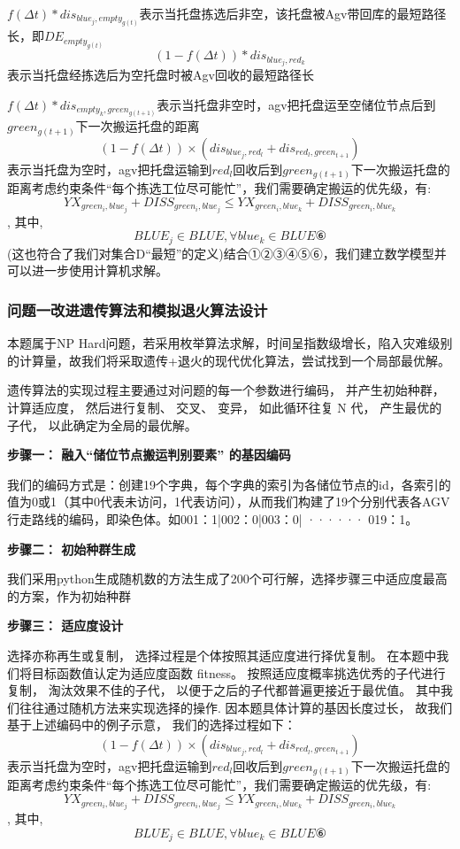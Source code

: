 \documentclass{article}
\begin{document}
$f(\Delta t)*dis_{blue_j,empty_{g(t)}}$表示当托盘拣选后非空，该托盘被Agv带回库的最短路径长，即$DE_{empty_{g(t)}}$
$$(1-f(\Delta t))*dis_{blue_j,red_k}$$表示当托盘经拣选后为空托盘时被Agv回收的最短路径长

$f(\Delta t)*dis_{empty_k,green_{g(t+1)}}$表示当托盘非空时，agv把托盘运至空储位节点后到
$green_{g(t+1)}$下一次搬运托盘的距离
$$(1-f(\Delta t)) \times (dis_{blue_j,red_l} + dis_{red_l,green_{t+1}})$$
表示当托盘为空时，agv把托盘运输到$red_l$回收后到$green_{g(t+1)}$下一次搬运托盘的距离考虑约束条件“每个拣选工位尽可能忙”，我们需要确定搬运的优先级，有:
$$YX_{green_i,blue_j}+DISS_{green_i,blue_j}≤YX_{green_i,blue_k}+DISS_{green_i,blue_k}$$,
其中,$$BLUE_j\in BLUE,\forall blue_k\in BLUE⑥$$
(这也符合了我们对集合D“最短”的定义)结合①②③④⑤⑥，我们建立数学模型并可以进一步使用计算机求解。

\subsubsection{问题一改进遗传算法和模拟退火算法设计}
本题属于NP Hard问题，若采用枚举算法求解，时间呈指数级增长，陷入灾难级别的计算量，故我们将采取遗传+退火的现代优化算法，尝试找到一个局部最优解。
	
	遗传算法的实现过程主要通过对问题的每一个参数进行编码， 并产生初始种群， 计算适应度， 然后进行复制、 交叉、 变异， 如此循环往复 N 代， 产生最优的子代， 以此确定为全局的最优解。 
	
	\textbf{步骤一： 融入“储位节点搬运判别要素” 的基因编码}
	
	
	
	我们的编码方式是：创建19个字典，每个字典的索引为各储位节点的id，各索引的值为0或1（其中0代表未访问，1代表访问），从而我们构建了19个分别代表各AGV行走路线的编码，即染色体。如{001：1|002：0|003：0| ······ 019：1}。
	
	\textbf{步骤二： 初始种群生成}
	
	我们采用python生成随机数的方法生成了200个可行解，选择步骤三中适应度最高的方案，作为初始种群
	
	\textbf{步骤三： 适应度设计}
	
	选择亦称再生或复制， 选择过程是个体按照其适应度进行择优复制。 在本题中我们将目标函数值认定为适应度函数 fitness。 按照适应度概率挑选优秀的子代进行复制， 淘汰效果不佳的子代， 以便于之后的子代都普遍更接近于最优值。 其中我们往往通过随机方法来实现选择的操作. 因本题具体计算的基因长度过长， 故我们基于上述编码中的例子示意， 我们的选择过程如下：
	$$(1-f(\Delta t)) \times (dis_{blue_j,red_l} + dis_{red_l,green_{t+1}})$$
	表示当托盘为空时，agv把托盘运输到$red_l$回收后到$green_{g(t+1)}$下一次搬运托盘的距离考虑约束条件“每个拣选工位尽可能忙”，我们需要确定搬运的优先级，有:
	$$YX_{green_i,blue_j}+DISS_{green_i,blue_j}≤YX_{green_i,blue_k}+DISS_{green_i,blue_k}$$,
	其中,$$BLUE_j\in BLUE,\forall blue_k\in BLUE⑥$$
	
\end{document}
